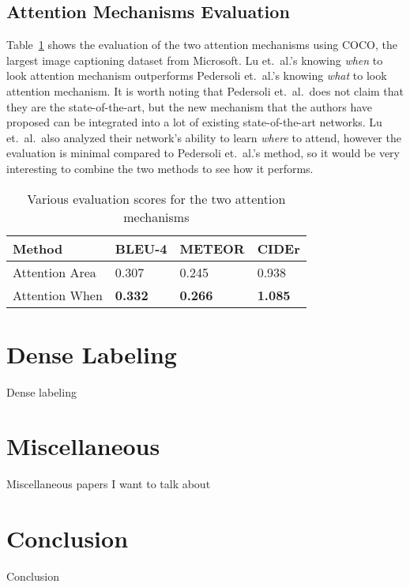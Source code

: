 \documentclass[10pt,twocolumn,letterpaper]{article}
\newcommand{\tabref}[1]{Table~\ref{tab:#1}}
\begin{document}
\subsection{Attention Mechanisms Evaluation}
\tabref{attention} shows the evaluation of the two attention mechanisms using
COCO, the largest image captioning dataset from Microsoft. Lu et.\ al.'s
knowing \textit{when} to look attention mechanism outperforms Pedersoli et.\
al.'s knowing \textit{what} to look attention mechanism. It is worth noting
that Pedersoli et.\ al.\ does not claim that they are the state-of-the-art,
but the new mechanism that the authors have proposed can be integrated into a
lot of existing state-of-the-art networks. Lu et.\ al.\ also analyzed their
network's ability to learn \textit{where} to attend, however the evaluation is
minimal compared to Pedersoli et.\ al.'s method, so it would be very
interesting to combine the two methods to see how it performs.
%
\begin{table}[]
\centering
\caption{Various evaluation scores for the two attention mechanisms}
\label{tab:attention}
\begin{tabular}{llll}
	\toprule
	Method         & BLEU-4         & METEOR         & CIDEr          \\
	\hline
	Attention Area & 0.307          & 0.245          & 0.938          \\
	Attention When & \textbf{0.332} & \textbf{0.266} & \textbf{1.085} \\
	\bottomrule
\end{tabular}
\end{table}
%
\section{Dense Labeling}

Dense labeling

\section{Miscellaneous}

Miscellaneous papers I want to talk about

\section{Conclusion}

Conclusion

{\small


}
\end{document}
